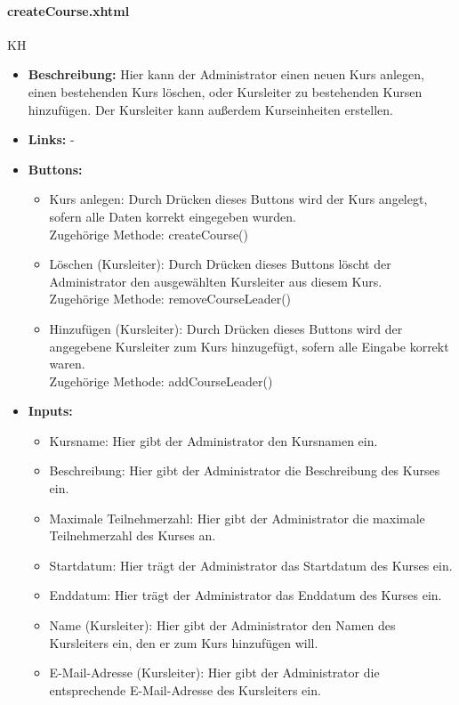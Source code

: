 				\paragraph{createCourse.xhtml}
					KH\\
					\begin{itemize}
						\item \textbf{Beschreibung:} Hier kann der Administrator einen neuen Kurs anlegen, einen bestehenden Kurs löschen, oder Kursleiter zu bestehenden Kursen hinzufügen. Der Kursleiter kann außerdem Kurseinheiten erstellen.
						\item \textbf{Links:} -
						\item \textbf{Buttons:}
							\begin{itemize}
								\item Kurs anlegen:  Durch Drücken dieses Buttons wird der Kurs angelegt, sofern alle Daten korrekt eingegeben wurden. \\ Zugehörige Methode: createCourse()
								\item Löschen (Kursleiter): Durch Drücken dieses Buttons löscht der Administrator den ausgewählten Kursleiter aus diesem Kurs. \\ Zugehörige Methode: removeCourseLeader()
								\item Hinzufügen (Kursleiter): Durch Drücken dieses Buttons wird der angegebene Kursleiter zum Kurs hinzugefügt, sofern alle Eingabe korrekt waren.	\\ Zugehörige Methode: addCourseLeader()
							\end{itemize}
						\item \textbf{Inputs:}
							\begin{itemize}
								\item Kursname: Hier gibt der Administrator den Kursnamen ein.
								\item Beschreibung: Hier gibt der Administrator die Beschreibung des Kurses ein.
								\item Maximale Teilnehmerzahl: Hier gibt der Administrator die maximale Teilnehmerzahl des Kurses an.
								\item Startdatum: Hier trägt der Administrator das Startdatum des Kurses ein.
								\item Enddatum: Hier trägt der Administrator das Enddatum des Kurses ein.
								\item Name (Kursleiter): Hier gibt der Administrator den Namen des Kursleiters ein, den er zum Kurs hinzufügen will.
								\item E-Mail-Adresse (Kursleiter): Hier gibt der Administrator die entsprechende E-Mail-Adresse des Kursleiters ein.

\end{itemize}
\end{itemize}
